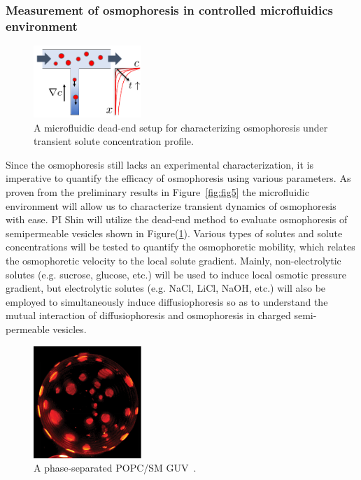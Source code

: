 \documentclass[11pt]{article}
\begin{document}
\subsubsection{Measurement of osmophoresis in controlled microfluidics
environment}
\label{subsubsec:measurement_osmophoresis}
\begin{figure}
\centerline{\includegraphics[width=1.6in]{figs/Microfluidic_dead-end.pdf}}
\caption{\label{fig:Microfluidic_dead-end} A microfluidic dead-end setup
  for characterizing osmophoresis under transient solute concentration
  profile.}
\end{figure}
%
Since the osmophoresis still lacks an experimental characterization, it
is imperative to quantify the efficacy of osmophoresis using various
parameters. As proven from the preliminary results in
Figure~\ref{fig:fig5} the microfluidic environment will allow us to
characterize transient dynamics of osmophoresis with ease.  PI Shin will
utilize the dead-end method to evaluate osmophoresis of semipermeable
vesicles shown in Figure(\ref{fig:Microfluidic_dead-end}).  Various
types of solutes and solute concentrations will be tested to quantify
the osmophoretic mobility, which relates the osmophoretic velocity to
the local solute gradient.  Mainly, non-electrolytic solutes (e.g.
sucrose, glucose, etc.) will be used to induce local osmotic pressure
gradient, but electrolytic solutes (e.g. NaCl, LiCl, NaOH, etc.) will
also be employed to simultaneously induce diffusiophoresis so as to
understand the mutual interaction of diffusiophoresis and osmophoresis
in charged semi-permeable vesicles.

\begin{figure}
\vspace*{-10pt}
\centerline{\includegraphics[width=1.6in]{figs/phase-separatedGUV.pdf}}
\caption{\label{fig:phase-separatedGUV} A phase-separated POPC/SM
  GUV~\cite{oglkecka2014}.}
\end{figure}
%
\end{document}
